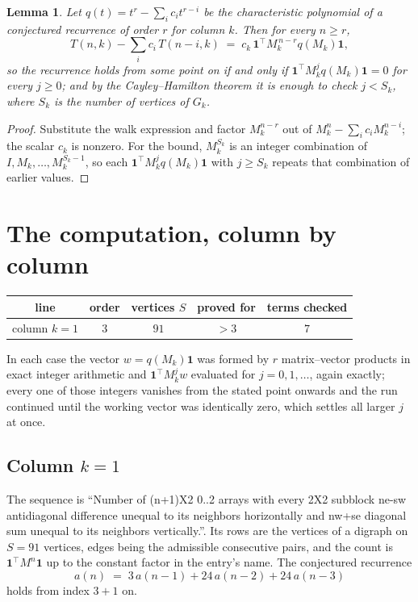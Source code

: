 \documentclass[11pt,a4paper]{article}
\theoremstyle{plain}
\newtheorem{lemma}[theorem]{Lemma}
\theoremstyle{definition}
\begin{document}
\begin{lemma}\label{lem:crit}
Let $q(t)=t^{r}-\sum_i c_it^{r-i}$ be the characteristic polynomial of a conjectured
recurrence of order $r$ for column $k$. Then for every $n\ge r$,
\[
T(n,k)-\sum_i c_i\,T(n-i,k)\;=\;c_k\,\mathbf{1}^{\!\top}M_k^{\,n-r}q(M_k)\mathbf{1},
\]
so the recurrence holds from some point on if and only if
$\mathbf{1}^{\!\top}M_k^{j}q(M_k)\mathbf{1}=0$ for every $j\ge0$; and by the
Cayley--Hamilton theorem it is enough to check $j<S_k$, where $S_k$ is the number of vertices
of $G_k$.
\end{lemma}

\begin{proof}
Substitute the walk expression and factor $M_k^{n-r}$ out of $M_k^{n}-\sum_ic_iM_k^{n-i}$;
the scalar $c_k$ is nonzero. For the bound, $M_k^{S_k}$ is an integer combination of
$I,M_k,\dots,M_k^{S_k-1}$, so each $\mathbf{1}^{\!\top}M_k^{j}q(M_k)\mathbf{1}$ with
$j\ge S_k$ repeats that combination of earlier values.
\end{proof}

\section{The computation, column by column}

\begin{center}
\begin{tabular}{ccccc}
line & order & vertices $S$ & proved for & terms checked \\ \hline
column $k$$=1$ & $3$ & $91$ & $>3$ & $7$ \\
\end{tabular}
\end{center}

In each case the vector $w=q(M_k)\mathbf{1}$ was formed by $r$ matrix--vector products in
exact integer arithmetic and $\mathbf{1}^{\!\top}M_k^{j}w$ evaluated for $j=0,1,\dots$,
again exactly; every one of those integers vanishes from the stated point onwards and the run
continued until the working vector was identically zero, which settles all larger $j$ at once.

\subsection*{Column $k$$=1$}
The sequence is ``Number of (n+1)X2 0..2 arrays with every 2X2 subblock ne-sw antidiagonal difference unequal to its neighbors horizontally and nw+se diagonal sum unequal to its neighbors vertically.''. Its rows are the vertices of a digraph on
$S=91$ vertices, edges being the admissible consecutive pairs, and the count is
$\mathbf{1}^{\!\top}M^{n}\mathbf{1}$ up to the constant factor in the entry's name.
The conjectured recurrence
\[
a(n)\;=\;3\,a(n-1) + 24\,a(n-2) + 24\,a(n-3)
\]
holds from index $3+1$ on.
\end{document}
